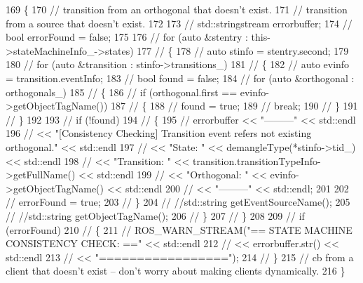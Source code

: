 \begin{DoxyCode}
169 \{
170     \textcolor{comment}{// transition from an orthogonal that doesn’t exist.}
171     \textcolor{comment}{// transition from a source that doesn’t exist.}
172 
173     \textcolor{comment}{// std::stringstream errorbuffer;}
174     \textcolor{comment}{// bool errorFound = false;}
175 
176     \textcolor{comment}{// for (auto &stentry : this->stateMachineInfo\_->states)}
177     \textcolor{comment}{// \{}
178     \textcolor{comment}{//     auto stinfo = stentry.second;}
179 
180     \textcolor{comment}{//     for (auto &transition : stinfo->transitions\_)}
181     \textcolor{comment}{//     \{}
182     \textcolor{comment}{//         auto evinfo = transition.eventInfo;}
183     \textcolor{comment}{//         bool found = false;}
184     \textcolor{comment}{//         for (auto &orthogonal : orthogonals\_)}
185     \textcolor{comment}{//         \{}
186     \textcolor{comment}{//             if (orthogonal.first == evinfo->getObjectTagName())}
187     \textcolor{comment}{//             \{}
188     \textcolor{comment}{//                 found = true;}
189     \textcolor{comment}{//                 break;}
190     \textcolor{comment}{//             \}}
191     \textcolor{comment}{//         \}}
192 
193     \textcolor{comment}{//         if (!found)}
194     \textcolor{comment}{//         \{}
195     \textcolor{comment}{//             errorbuffer << "---------" << std::endl}
196     \textcolor{comment}{//                         << "[Consistency Checking] Transition event refers not existing orthogonal."
       << std::endl}
197     \textcolor{comment}{//                         << "State: " << demangleType(*stinfo->tid\_) << std::endl}
198     \textcolor{comment}{//                         << "Transition: " << transition.transitionTypeInfo->getFullName() <<
       std::endl}
199     \textcolor{comment}{//                         << "Orthogonal: " << evinfo->getObjectTagName() << std::endl}
200     \textcolor{comment}{//                         << "---------" << std::endl;}
201 
202     \textcolor{comment}{//             errorFound = true;}
203     \textcolor{comment}{//         \}}
204     \textcolor{comment}{//         //std::string getEventSourceName();}
205     \textcolor{comment}{//         //std::string getObjectTagName();}
206     \textcolor{comment}{//     \}}
207     \textcolor{comment}{// \}}
208 
209     \textcolor{comment}{// if (errorFound)}
210     \textcolor{comment}{// \{}
211     \textcolor{comment}{//     ROS\_WARN\_STREAM("== STATE MACHINE CONSISTENCY CHECK: ==" << std::endl}
212     \textcolor{comment}{//                                                              << errorbuffer.str() << std::endl}
213     \textcolor{comment}{//                                                              << "=================");}
214     \textcolor{comment}{// \}}
215     \textcolor{comment}{// cb from a client that doesn’t exist – don’t worry about making clients dynamically.}
216 \}
\end{DoxyCode}

